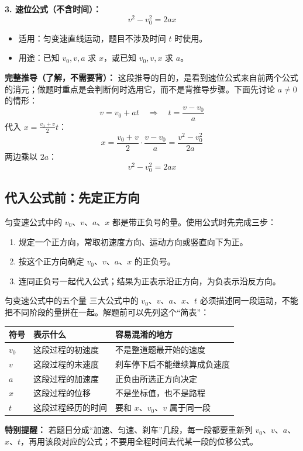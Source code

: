 \textbf{3. 速位公式（不含时间）：}
\[
\boxed{v^2 - v_0^2 = 2 a x}
\]
\begin{itemize}
  \item 适用：匀变速直线运动，题目不涉及时间 $t$ 时使用。
  \item 用途：已知 $v_0, v, a$ 求 $x$，或已知 $v_0, v, x$ 求 $a$。
\end{itemize}

\textbf{完整推导（了解，不需要背）：} 这段推导的目的，是看到速位公式来自前两个公式的消元；做题时重点是会判断何时选用它，而不是背推导步骤。下面先讨论 $a\neq0$ 的情形：
\[
v = v_0 + at \quad\Rightarrow\quad t = \frac{v - v_0}{a}
\]
代入 $x = \frac{v_0 + v}{2} t$：
\[
x = \frac{v_0 + v}{2} \cdot \frac{v - v_0}{a}
    = \frac{v^2 - v_0^2}{2a}
\]
两边乘以 $2a$：
\[
v^2 - v_0^2 = 2 a x
\]

\subsection*{代入公式前：先定正方向}

匀变速公式中的 $v_0$、$v$、$a$、$x$ 都是带正负号的量。使用公式时先完成三步：
\begin{enumerate}
  \item 规定一个正方向，常取初速度方向、运动方向或竖直向下为正。
  \item 按这个正方向确定 $v_0$、$v$、$a$、$x$ 的正负号。
  \item 连同正负号一起代入公式；结果为正表示沿正方向，为负表示沿反方向。
\end{enumerate}

\begin{learningbox}{匀变速公式中的五个量}
三大公式中的 $v_0$、$v$、$a$、$x$、$t$ 必须描述同一段运动，不能把不同阶段的量拼在一起。解题前可以先列这个“简表”：

\begin{center}
\begin{tabular}{lll}
\toprule
符号 & 表示什么 & 容易混淆的地方 \\
\midrule
$v_0$ & 这段过程的初速度 & 不是整道题最开始的速度 \\
$v$ & 这段过程的末速度 & 刹车停下后不能继续算成负速度 \\
$a$ & 这段过程的加速度 & 正负由所选正方向决定 \\
$x$ & 这段过程的位移 & 不是坐标值，也不是路程 \\
$t$ & 这段过程经历的时间 & 要和 $x$、$v_0$、$v$ 属于同一段 \\
\bottomrule
\end{tabular}
\end{center}

\textbf{特别提醒：} 若题目分成“加速、匀速、刹车”几段，每一段都要重新列 $v_0$、$v$、$a$、$x$、$t$，再用该段对应的公式；不要用全程时间去代某一段的位移公式。
\end{learningbox}

